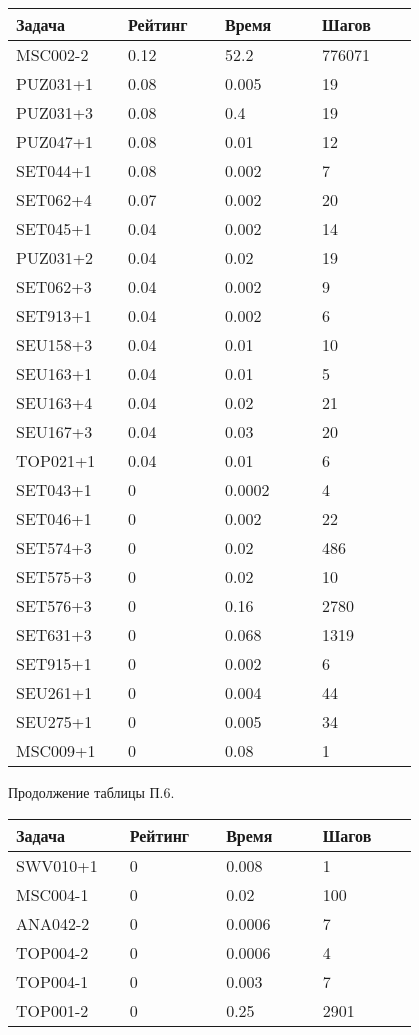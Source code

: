 \begin{longtable}[H]{|p{0.2\linewidth}|p{0.2\linewidth}|p{0.2\linewidth}|p{0.2\linewidth}|}
\hline
\textbf{Задача} & \textbf{Рейтинг} & \textbf{Время} & \textbf{Шагов} \\
\hline
MSC002-2 &  0.12 &  52.2 &  776071 \\
\hline
PUZ031+1 &  0.08 &  0.005 &  19 \\
\hline
PUZ031+3 &  0.08 &  0.4 &  19 \\
\hline
PUZ047+1 &  0.08 &  0.01 &  12 \\
\hline
SET044+1 &  0.08 &  0.002 &  7 \\
\hline
SET062+4 &  0.07 &  0.002 &  20 \\
\hline
SET045+1 &  0.04 &  0.002 &  14 \\
\hline
PUZ031+2 &  0.04 &  0.02 &  19 \\
\hline
SET062+3 &  0.04 &  0.002 &  9 \\
\hline
SET913+1 &  0.04 &  0.002 &  6 \\
\hline
SEU158+3 &  0.04 &  0.01 &  10 \\
\hline
SEU163+1 &  0.04 &  0.01 &  5 \\
\hline
SEU163+4 &  0.04 &  0.02 &  21 \\
\hline
SEU167+3 &  0.04 &  0.03 &  20 \\
\hline
TOP021+1 &  0.04 &  0.01 &  6 \\
\hline
SET043+1 &  0 &  0.0002 &  4 \\
\hline
SET046+1 &  0 &  0.002 &  22 \\
\hline
SET574+3 &  0 &  0.02 &  486 \\
\hline
SET575+3 &  0 &  0.02 &  10 \\
\hline
SET576+3 &  0 &  0.16 &  2780 \\
\hline
SET631+3 &  0 &  0.068 &  1319 \\
\hline
SET915+1 &  0 &  0.002 &  6 \\
\hline
SEU261+1 &  0 &  0.004 &  44 \\
\hline
SEU275+1 &  0 &  0.005 &  34 \\
\hline
MSC009+1 &  0 &  0.08 &  1  \\
\hline
\end{longtable}
\begin{center}
Продолжение таблицы П.6.
\end{center}

\begin{longtable}[H]{|p{0.2\linewidth}|p{0.2\linewidth}|p{0.2\linewidth}|p{0.2\linewidth}|}
\hline
\textbf{Задача} & \textbf{Рейтинг} & \textbf{Время} & \textbf{Шагов} \\
\hline
SWV010+1 &  0 & 0.008 &  1  \\
\hline
MSC004-1 &  0 &  0.02 &  100 \\
\hline
ANA042-2 & 0 & 0.0006 & 7 \\
\hline
TOP004-2 & 0 & 0.0006 & 4 \\
\hline
TOP004-1 & 0 & 0.003 & 7 \\
\hline
TOP001-2 & 0 & 0.25 & 2901 \\
\hline
\end{longtable}


